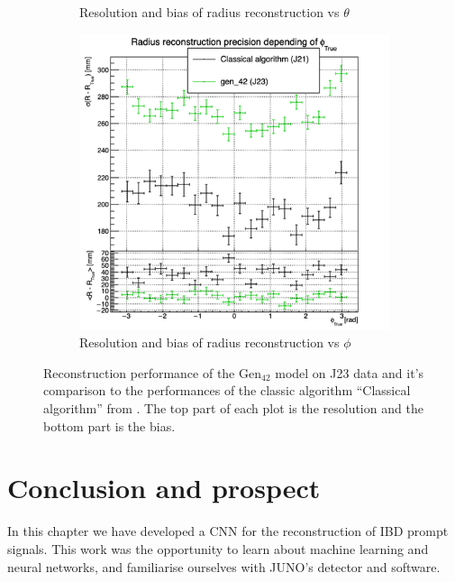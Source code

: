 \documentclass[../main.tex]{subfiles}
\begin{document}
\begin{figure}[ht]
\begin{subfigure}[t]{0.32\linewidth}
    \caption{Resolution and bias of radius reconstruction vs $\theta$}
    \label{fig:jcnn:vic_cnn:multi_vic_42_MSBvTTC}
  \end{subfigure}
  \begin{subfigure}[t]{0.32\linewidth}
    \centering
    \includegraphics[width=\linewidth]{images/jcnn/vic_cnn/multi_vic_42_MSBvPTC.png}
    \caption{Resolution and bias of radius reconstruction vs $\phi$}
    \label{fig:jcnn:vic_cnn:multi_vic_42_MSBvPTC}
  \end{subfigure}
  \caption{Reconstruction performance of the $\mathrm{Gen}_{42}$ model on J23 data and it's comparison to the performances of the classic algorithm ``Classical algorithm'' from \cite{lebrin_towards_2022}. The top part of each plot is the resolution and the bottom part is the bias.}
  \label{fig:jcnn:vic_cnn:gen42}
\end{figure}

\section{Conclusion and prospect}
\label{sec:jcnn:prospect}

In this chapter we have developed a CNN for the reconstruction of IBD prompt signals. This work was the opportunity to learn about machine learning and neural networks, and familiarise ourselves with JUNO's detector and software.
\end{document}

